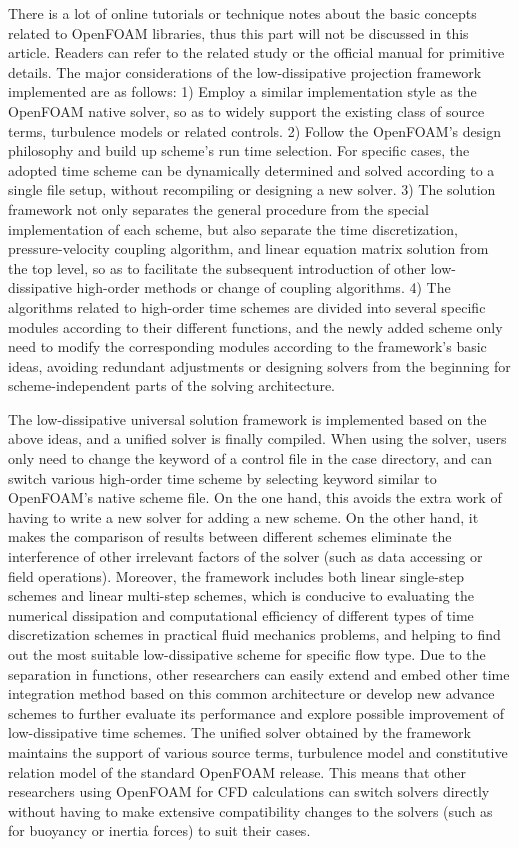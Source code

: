 \documentclass{article}
\begin{document}
There is a lot of online tutorials or technique notes about the basic concepts related to OpenFOAM libraries, thus this part will not be discussed in this article. Readers can refer to the related study \citep{Vuorinen:2014} or the official manual \citep{FOAM} for primitive details. The major considerations of the low-dissipative projection framework implemented are as follows: 1) Employ a similar implementation style as the OpenFOAM native solver, so as to widely support the existing class of source terms, turbulence models or related controls. 2) Follow the OpenFOAM's design philosophy and build up scheme's run time selection. For specific cases, the adopted time scheme can be dynamically determined and solved according to a single file setup, without recompiling or designing a new solver. 3) The solution framework not only separates the general procedure from the special implementation of each scheme, but also separate the time discretization, pressure-velocity coupling algorithm, and linear equation matrix solution from the top level, so as to facilitate the subsequent introduction of other low-dissipative high-order methods or change of coupling algorithms. 4) The algorithms related to high-order time schemes are divided into several specific modules according to their different functions, and the newly added scheme only need to modify the corresponding modules according to the framework's basic ideas, avoiding redundant adjustments or designing solvers from the beginning for scheme-independent parts of the solving architecture.

The low-dissipative universal solution framework is implemented based on the above ideas, and a unified solver is finally compiled. When using the solver, users only need to change the keyword of a control file in the case directory, and can switch various high-order time scheme by selecting keyword similar to OpenFOAM's native scheme file. On the one hand, this avoids the extra work of having to write a new solver for adding a new scheme. On the other hand, it makes the comparison of results between different schemes eliminate the interference of other irrelevant factors of the solver (such as data accessing or field operations). Moreover, the framework includes both linear single-step schemes and linear multi-step schemes, which is conducive to evaluating the numerical dissipation and computational efficiency of different types of time discretization schemes in practical fluid mechanics problems, and helping to find out the most suitable low-dissipative scheme for specific flow type. Due to the separation in functions, other researchers can easily extend and embed other time integration method based on this common architecture or develop new advance schemes to further evaluate its performance and explore possible improvement of low-dissipative time schemes. The unified solver obtained by the framework maintains the support of various source terms, turbulence model and constitutive relation model of the standard OpenFOAM release. This means that other researchers using OpenFOAM for CFD calculations can switch solvers directly without having to make extensive compatibility changes to the solvers (such as for buoyancy or inertia forces) to suit their cases.
\end{document}
